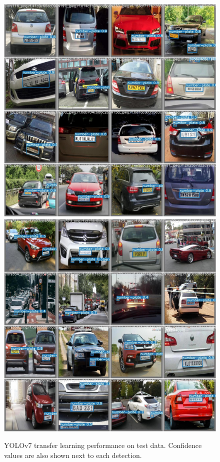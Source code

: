 \begin{figure}
        \centering
        \includegraphics[height=.5\textheight]{figures/transfer-learning-eval/test_batch0_pred.jpg}
        \includegraphics[height=.5\textheight]{figures/transfer-learning-eval/test_batch2_pred.jpg}
        \caption{YOLOv7 transfer learning performance on test data. Confidence
        values are also shown next to each detection.}
        \label{fig:yolo-test-eval}
\end{figure}



